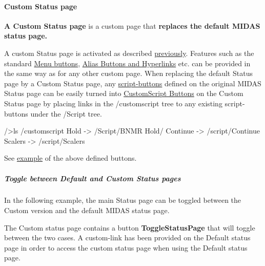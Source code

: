 \par


\par
 \par




\label{index_end}
\hypertarget{index_end}{}
 \paragraph{Custom Status page}\label{RC_mhttpd_custom_status}
\par
 

{\bfseries A Custom Status page} is a custom page that {\bfseries replaces the default MIDAS status page.} \par
\par
 A custom Status page is activated as described \hyperlink{RC_mhttpd_Activate_RC_odb_custom_status}{previously}. Features such as the standard \hyperlink{RC_mhttpd_custom_features_RC_mhttpd_custom_midas_buttons}{Menu buttons}, \hyperlink{RC_mhttpd_custom_features_RC_mhttpd_custom_alias}{Alias Buttons and Hyperlinks} etc. can be provided in the same way as for any other custom page. When replacing the default Status page by a Custom Status page, any \hyperlink{RC_mhttpd_status_page_features_RC_mhttpd_status_script_buttons}{script-\/buttons} defined on the original MIDAS Status page can be easily turned into \hyperlink{RC_mhttpd_custom_features_RC_mhttpd_custom_script_buttons}{CustomScript Buttons} on the Custom Status page by placing links in the  /customscript  tree to any existing script-\/buttons under the  /Script  tree.


\begin{DoxyCode}
/>ls /customscript
Hold      -> /Script/BNMR Hold/
Continue  -> /script/Continue 
Scalers   -> /script/Scalers
\end{DoxyCode}
 See \hyperlink{RC_mhttpd_custom_status_RC_mhttpd_status_toggle}{example} of the above defined buttons.\hypertarget{RC_mhttpd_custom_status_RC_mhttpd_status_toggle}{}\subparagraph{Toggle between Default and Custom Status pages}\label{RC_mhttpd_custom_status_RC_mhttpd_status_toggle}
In the following example, the main Status page can be toggled between the Custom version and the default MIDAS status page.

The Custom status page contains a button {\bfseries ToggleStatusPage} that will toggle between the two cases. A custom-\/link has been provided on the Default status page in order to access the custom status page when using the Default status page.

